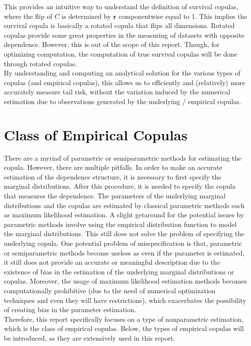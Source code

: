 \documentclass[12pt]{report}
\newcommand{\1}{\mathbf{1}}
\begin{document}
\begin{flushleft}
This provides an intuitive way to understand the definition of survival copulas, where the flip of $C$ is determined by $\textbf{r}$ componentwise equal to 1. This implies the survival copula is basically a rotated copula that flips all dimensions. Rotated copulas provide some great properties in the measuring of datasets with opposite dependence. However, this is out of the scope of this report. Though, for optimizing computation, the computation of true survival copulas will be done through rotated copulas.\\
\vspace{0.5cm}
By understanding and computing an analytical solution for the various types of copulas (and empirical copulas), this allows us to efficiently and (relatively) more accurately measure tail risk, without the variation induced by the numerical estimation due to observations generated by the underlying / empirical copulas. 

\newpage
\section{Class of Empirical Copulas}
\vspace{0.5cm}
There are a myriad of parametric or semiparametric methods for estimating the copula. However, there are multiple pitfalls. In order to make an accurate estimation of the dependence structure, it is necessary to first specify the marginal distributions. After this procedure, it is needed to specify the copula that measures the dependence. The parameters of the underlying marginal distributions and the copulas are estimated by classical parametric methods such as maximum likelihood estimation. A slight getaround for the potential issues by parametric methods involve using the empirical distribution function to model the marginal distributions. This still does not solve the problem of specifying the underlying copula. One potential problem of misspecification is that, parametric or semiparametric methods become useless as even if the parameter is estimated, it still does not provide an accurate or meaningful description due to the existence of bias in the estimation of the underlying marginal distributions or copulas. Moreover, the usage of maximum likelihood estimation methods becomes computationally prohibitive (due to the need of numerical optimization techniques and even they will have restrictions), which exacerbates the possibility of creating bias in the parameter estimation. \\
\vspace{0.5cm}
Therefore, this report specifically focuses on a type of nonparametric estimation, which is the class of empirical copulas. Below, the types of empirical copulas will be introduced, as they are extensively used in this report.


\end{flushleft}
\end{document}

